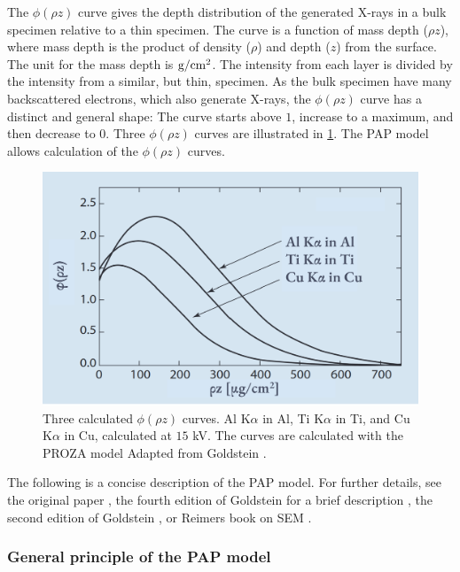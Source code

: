 The $\phi(\rho z)$ curve gives the depth distribution of the generated X-rays in a bulk specimen relative to a thin specimen.
The curve is a function of mass depth ($\rho z$), where mass depth is the product of density ($\rho$) and depth ($z$) from the surface.
The unit for the mass depth is $\textnormal{g}/\textnormal{cm}^2$.
The intensity from each layer is divided by the intensity from a similar, but thin, specimen.
As the bulk specimen have many backscattered electrons, which also generate X-rays, the $\phi(\rho z)$ curve has a distinct and general shape:
The curve starts above $1$, increase to a maximum, and then decrease to $0$.
Three $\phi(\rho z)$ curves are illustrated in \cref{fig:theory:quantification:phi_rho_z_curves}.
The PAP model allows calculation of the $\phi(\rho z)$ curves.




\begin{figure}[htbp]
    \centering
    \includegraphics[width=0.65\linewidth]{figures/phi_rho_z_curves__goldstein.png}
    \caption{
        Three calculated $\phi(\rho z)$ curves.
        Al K$\alpha$ in Al, Ti K$\alpha$ in Ti, and Cu K$\alpha$ in Cu, calculated at $15$ kV.
        The curves are calculated with the PROZA model \cite{bastin_proza_1988}
        Adapted from Goldstein \cite[Fig. 19.9]{goldstein_scanning_2018}.
    }
    \label{fig:theory:quantification:phi_rho_z_curves}
\end{figure}


The following is a concise description of the PAP model.
For further details, see the original paper \cite{pap_1991}, the fourth edition of Goldstein for a brief description \cite{goldstein_scanning_2018}, the second edition of Goldstein \cite{goldstein_2ed_1992}, or Reimers book on SEM \cite{reimer_sem}.







\subsubsection{General principle of the PAP model}
\label{theory:quantitative:pap:general_principle}

